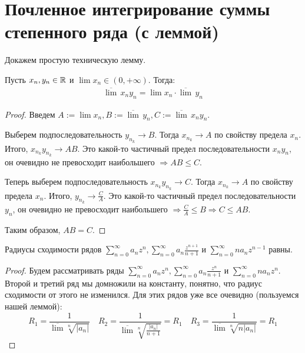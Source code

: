 \section{Почленное интегрирование суммы степенного ряда (с леммой)}
Докажем простую техническую лемму.

\begin{lemma}
    Пусть $x_n, y_n \in \mathbb{R}$ и $\lim x_n \in (0, +\infty)$. 
    Тогда:
    \begin{gather*}
        \overline{\lim} \, x_ny_n = \lim x_n \cdot \overline{\lim} \, y_n
    \end{gather*}
\end{lemma}
\begin{proof}
    Введем $A := \lim x_n, B := \overline{\lim} \, y_n, C := \overline{\lim} \, x_ny_n$.

    \quad Выберем подпоследовательность $y_{n_k} \to B$. 
    Тогда $x_{n_k} \to A$ по свойству предела $x_n$.
    Итого, $x_{n_k}y_{n_k} \to AB$. 
    Это какой-то частичный предел последовательности $x_ny_n$, он очевидно не превосходит наибольшего $\Rightarrow AB \leqslant C$.

    \quad Теперь выберем подпоследовательность $x_{n_k}y_{n_k} \to C$. 
    Тогда $x_{n_k} \to A$ по свойству предела $x_n$.
    Итого, $y_{n_k} \to \frac{C}{A}$.
    Это какой-то частичный предел последовательности $y_n$, он очевидно не превосходит наибольшего $\Rightarrow \frac{C}{A} \leqslant B \Rightarrow C \leqslant AB$.

    \quad Таким образом, $AB = C$.
\end{proof}

\begin{follow}
    Радиусы сходимости рядов $\sum\limits_{n=0}^\infty a_n z^n, \sum\limits_{n=0}^\infty a_n \frac{z^{n+1}}{n+1}$ и $\sum\limits_{n=0}^\infty n a_n z^{n-1}$ равны.
\end{follow}
\begin{proof}
    Будем рассматривать ряды $\sum\limits_{n=0}^\infty a_n z^n, \sum\limits_{n=0}^\infty a_n \frac{z^n}{n+1}$ и $\sum\limits_{n=0}^\infty n a_n z^{n}$. 
    Второй и третий ряд мы домножили на константу, понятно, что радиус сходимости от этого не изменился.
    Для этих рядов уже все очевидно (пользуемся нашей леммой): \[ R_1 = \frac{1}{\overline{\lim} \sqrt[n]{|a_n|}} \quad R_2 = \frac{1}{\overline{\lim} \sqrt[n]{\frac{|a_n|}{n+1}}} = R_1 \quad R_3 = \frac{1}{\overline{\lim} \sqrt[n]{n|a_n|}} = R_1   \]
\end{proof}

